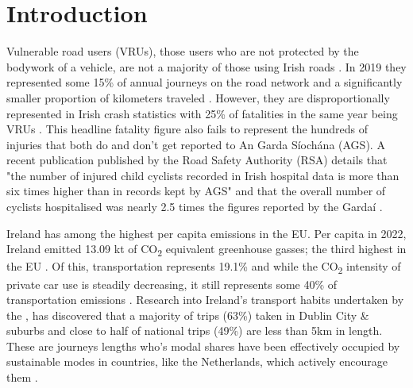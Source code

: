 \chapter{Introduction}







Vulnerable road users (VRUs), those users who are not protected by the bodywork of a vehicle, are not a majority of those using Irish roads \citep{constantProtectingVulnerableRoad2010}. In 2019 they represented some 15\% of annual journeys on the road network and a significantly smaller proportion of kilometers traveled \citep{departmentoftransportTransportTrends20202020}. However, they are disproportionally represented in Irish crash statistics with 25\% of fatalities in the same year being VRUs \citep{rsaProvisionalReviewFatal2021}. This headline fatality figure also fails to represent the hundreds of injuries that both do and don't get reported to An Garda Síochána (AGS). A recent publication published by the Road Safety Authority (RSA) details that "the number of injured child cyclists recorded in Irish hospital data is more than six times higher than in records kept by AGS" and that the overall number of cyclists hospitalised was nearly 2.5 times the figures reported by the Gardaí \citep{castelloSeriousInjuriesPedal2023}.

Ireland has among the highest per capita emissions in the EU. Per capita in 2022, Ireland emitted 13.09 kt of CO\textsubscript{2} equivalent greenhouse gasses; the third highest in the EU \citep{eeaEEAGreenhouseGases2024}. Of this, transportation represents 19.1\% and while the CO\textsubscript{2} intensity of private car use is steadily decreasing, it still represents some 40\% of transportation emissions \citep{walshEnergyIreland20202021}. Research into Ireland's transport habits undertaken by the \citet{ntaNationalHouseholdTravel2022}, has discovered that a majority of trips (63\%) taken in Dublin City \& suburbs and close to half of national trips (49\%) are less than 5km in length. These are journeys lengths who's modal shares have been effectively occupied by sustainable modes in countries, like the Netherlands, which actively encourage them \citep{tonCyclingWalkingDeterminants2019}.

